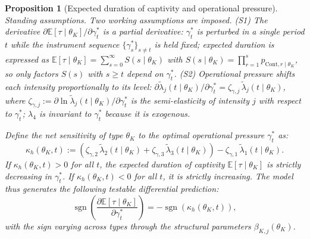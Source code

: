 \documentclass[review,authoryear,12pt]{elsarticle}
\theoremstyle{plain}
\newtheorem{proposition}[theorem]{Proposition}
\theoremstyle{definition}
\newcommand{\1}{\mathbf{1}}
\begin{document}
\begin{proposition}[Expected duration of captivity and operational pressure]
\label{prop:expected-captivity-gamma}
\noindent\textit{Standing assumptions.} Two working assumptions are imposed. \textup{(S1)} The derivative $\partial\mathbb{E}[\tau\mid\theta_K]/\partial\gamma_t^\ast$ is a partial derivative: $\gamma_t^\ast$ is perturbed in a single period $t$ while the instrument sequence $\{\gamma_s^\ast\}_{s\neq t}$ is held fixed; expected duration is expressed as $\mathbb{E}[\tau\mid\theta_K]=\sum_{s=0}^{\infty}S(s\mid\theta_K)$ with $S(s\mid\theta_K)=\prod_{r=1}^{s}p_{\mathrm{Cont},r\mid\theta_K}$, so only factors $S(s)$ with $s\geq t$ depend on $\gamma_t^\ast$. \textup{(S2)} Operational pressure shifts each intensity proportionally to its level: $\partial\tilde{\lambda}_j(t\mid\theta_K)/\partial\gamma_t^\ast=\zeta_{\gamma,j}\,\tilde{\lambda}_j(t\mid\theta_K)$, where $\zeta_{\gamma,j}:=\partial\ln\tilde{\lambda}_j(t\mid\theta_K)/\partial\gamma_t^\ast$ is the semi-elasticity of intensity $j$ with respect to $\gamma_t^\ast$; $\lambda_4$ is invariant to $\gamma_t^\ast$ because it is exogenous.

\medskip
Define the net sensitivity of type $\theta_K$ to the optimal operational pressure $\gamma_t^\ast$ as:
\begin{equation}
\label{eq:kappa-c}
\kappa_h(\theta_K, t) := \left( \zeta_{\gamma,2}\, \tilde{\lambda}_2(t \mid \theta_K) + \zeta_{\gamma,3}\, \tilde{\lambda}_3(t \mid \theta_K) \right) - \zeta_{\gamma,1}\, \tilde{\lambda}_1(t \mid \theta_K).
\end{equation}
If $\kappa_h(\theta_K, t) > 0$ for all $t$, the expected duration of captivity $\mathbb{E}[\tau \mid \theta_K]$ is strictly decreasing in $\gamma_t^\ast$. If $\kappa_h(\theta_K, t) < 0$ for all $t$, it is strictly increasing. The model thus generates the following testable differential prediction:
\begin{equation}
\operatorname{sgn} \left( \frac{\partial \mathbb{E}[\tau \mid \theta_K]}{\partial \gamma_t^\ast} \right) = - \operatorname{sgn}(\kappa_h(\theta_K, t)),
\end{equation}
with the sign varying across types through the structural parameters $\beta_{K,j}(\theta_K)$.
\end{proposition}
\end{document}
